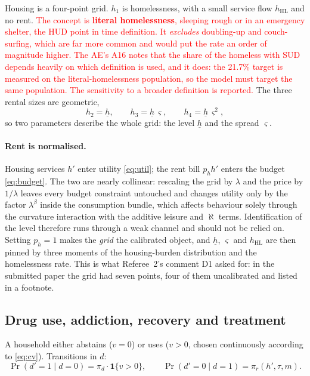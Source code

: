 \documentclass[11pt]{article}
\newcommand{\nw}[1]{\textcolor{red}{#1}}
\newcommand{\ind}[1]{\mathbf{1}\{#1\}}
\begin{document}
Housing is a four-point grid. $h_1$ is homelessness, with a small service flow
$h_{\text{HL}}$ and no rent. \nw{The concept is \textbf{literal homelessness}, sleeping rough or in an emergency shelter, the HUD point in time definition. It
\emph{excludes} doubling-up and couch-surfing, which are far more common and
would put the rate an order of magnitude higher. The AE's A16 notes that the
share of the homeless with SUD depends heavily on which definition is used, and
it does: the 21.7\% target is measured on the literal-homelessness population,
so the model must target the same population. The sensitivity to a broader
definition is reported.} The three rental sizes are geometric,
\begin{equation}
h_2=\underline h,\qquad h_3=\underline h\,\varsigma,\qquad h_4=\underline h\,\varsigma^{2},
\end{equation}
so two parameters describe the whole grid: the level $\underline h$ and the
spread $\varsigma$.

\paragraph{Rent is normalised.} Housing services $h'$ enter utility
\eqref{eq:util}; the rent bill $p_h h'$ enters the budget \eqref{eq:budget}. The
two are nearly collinear: rescaling the grid by $\lambda$ and the price by
$1/\lambda$ leaves every budget constraint untouched and changes utility only by
the factor $\lambda^{\beta}$ inside the consumption bundle, which affects
behaviour solely through the curvature interaction with the additive leisure and
$\aleph$ terms. Identification of the level therefore runs through a weak
channel and should not be relied on. Setting $p_h=1$ makes the \emph{grid} the
calibrated object, and $\underline h$, $\varsigma$ and $h_{\text{HL}}$ are then
pinned by three moments of the housing-burden distribution and the homelessness
rate. This is what Referee~2's comment D1 asked for: in the submitted paper the
grid had seven points, four of them uncalibrated and listed in a footnote.

\subsection{Drug use, addiction, recovery and treatment}

A household either abstains ($v=0$) or uses ($v>0$, chosen continuously
according to \eqref{eq:cv}). Transitions in $d$:
\begin{equation}
\Pr(d'=1\mid d=0)=\pi_d\cdot\ind{v>0},
\qquad
\Pr(d'=0\mid d=1)=\pi_r(h',\tau,m).
\label{eq:dtrans}
\end{equation}
\end{document}
